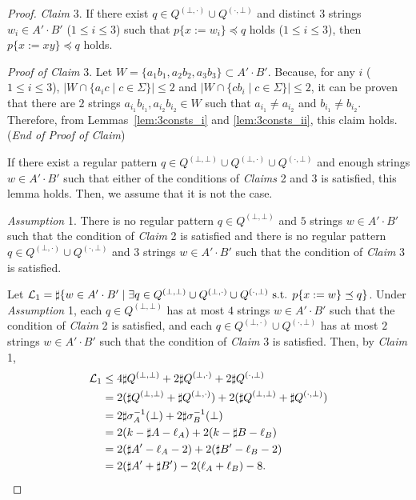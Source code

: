 \begin{proof}
\smallskip

\noindent
\textit{Claim} 3. If there exist $q \in Q^{(\bot,\cdot)} \cup Q^{(\cdot,\bot)}$ and distinct $3$ strings $w_{i} \in A'\cdot B'$ ($1\leq i\leq 3$) such that $p \{ x:=w_{i} \} \preceq q$ holds ($1\leq i\leq 3$),  then $p \{ x:=xy \} \preceq q$ holds.

\noindent
\textit{Proof of Claim} 3.
Let $W = \{a_{1}b_{1},a_{2}b_{2},a_{3}b_{3}\} \subset A'\cdot B'$.
Because, for any $i$ ($1\leq i\leq 3$), $|W \cap \{a_{i}c \mid c \in \Sigma\}| \leq 2$ and  $|W \cap \{cb_{i} \mid c \in \Sigma\}| \leq 2$, it can be proven that there are $2$ strings $a_{i_{1}}b_{i_{1}},a_{i_{2}}b_{i_{2}}\in W$ such that $a_{i_{1}} \not= a_{i_{2}}$ and $b_{i_{1}} \not= b_{i_{2}}$.
Therefore, from Lemmas~\ref{lem:3consts_i} and \ref{lem:3consts_ii}, this claim holds. (\textit{End of Proof of Claim})

\smallskip

\noindent
If there exist a regular pattern $q \in Q^{(\bot,\bot)} \cup Q^{(\bot,\cdot)} \cup Q^{(\cdot,\bot)}$ and enough strings $w \in A'\cdot B'$ such that either of the conditions of \textit{Claims} 2 and 3 is satisfied, this lemma holds. Then, we assume that it is not the case.

\smallskip

\noindent
\textit{Assumption} 1.
There is no regular pattern $q \in Q^{(\bot,\bot)}$ and $5$ strings $w \in A'\cdot B'$ such that the condition of \textit{Claim} 2 is satisfied and there is no regular pattern $q \in Q^{(\bot,\cdot)} \cup Q^{(\cdot,\bot)}$ and $3$ strings $w \in A'\cdot B'$ such that the condition of \textit{Claim} 3 is satisfied.

\smallskip

\noindent
Let ${\cal L}_{1} = \sharp\{w \in A'\cdot B' \mid \exists q \in Q^{(\bot,\bot)} \cup Q^{(\bot,\cdot)} \cup Q^{(\cdot,\bot)} \mbox{ s.t. } p\{x:=w\} \preceq q\}$.
Under \textit{Assumption} 1, each $q\in Q^{(\bot,\bot)}$ has at most $4$ strings $w \in A'\cdot B'$ such that the condition of \textit{Claim} 2 is satisfied, and each $q \in Q^{(\bot,\cdot)} \cup Q^{(\cdot,\bot)}$ has at most $2$ strings $w \in A'\cdot B'$ such that the condition of \textit{Claim} 3 is satisfied.
Then, by \textit{Claim} 1,
\begin{align*}
  {\cal L}_{1} &\leq 4\sharp Q^{(\bot,\bot)} + 2\sharp Q^{(\bot,\cdot)} + 2\sharp Q^{(\cdot,\bot)}\\
  & = 2(\sharp Q^{(\bot,\bot)} + \sharp Q^{(\bot,\cdot)}) + 2(\sharp Q^{(\bot,\bot)} + \sharp Q^{(\cdot,\bot)})\\
  & = 2\sharp \sigma_{A}^{-1}(\bot) + 2\sharp \sigma_{B}^{-1}(\bot)\\
  & = 2(k - \sharp A - \ell_{A}) + 2(k - \sharp B - \ell_{B})\\
  & = 2(\sharp A' - \ell_{A} - 2) + 2(\sharp B' - \ell_{B} - 2)\\
  & = 2(\sharp A' + \sharp B') - 2(\ell_{A} + \ell_{B}) - 8.
\end{align*}


\end{proof}
